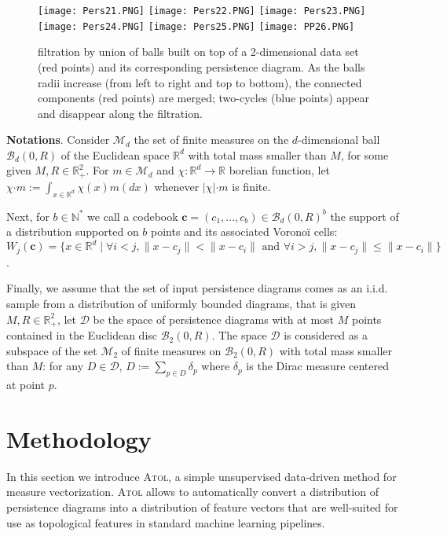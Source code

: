\documentclass[twoside]{article}
\newcommand{\cb}{\mathbf{c}}
\begin{document}
\begin{figure}
	\centering
	\texttt{[image: Pers21.PNG]}
	\texttt{[image: Pers22.PNG]}
	\texttt{[image: Pers23.PNG]}\\
	\texttt{[image: Pers24.PNG]}
	\texttt{[image: Pers25.PNG]}
	\texttt{[image: PP26.PNG]}
	\caption{filtration by union of balls built on top of a 2-dimensional data set (red points) and its corresponding persistence diagram. As the balls radii increase (from left to right and top to bottom), the connected components (red points) are merged; two-cycles (blue points) appear and disappear along the filtration.}
	\label{fig:persistence}
\end{figure}


\textbf{Notations}. Consider $\mathcal{M}_d$ the set of finite measures on the $d$-dimensional ball $\mathcal{B}_d(0,R)$ of the Euclidean space $\mathbb{R}^d$ with total mass smaller than $M$, for some given $M,R \in \mathbb{R}_+^2$. For $m \in \mathcal{M}_d$ and $\chi: \mathbb{R}^d \rightarrow \mathbb{R}$ borelian function, let $\chi \boldsymbol{\cdot} m := \int_{x \in \mathbb{R}^d} \chi(x) m(dx)$ whenever $|\chi| \boldsymbol{\cdot} m$ is finite.

Next, for $b \in \mathbb{N}^*$ we call a codebook $\cb = (c_1, \dots, c_b) \in \mathcal{B}_d(0, R)^b$ the support of a distribution supported on $b$ points and its associated Voronoï cells: $W_j(\cb) = \{ x \in \mathbb{R}^d \mid \forall i < j, \| x - c_j\| < \| x-c_i\| \text{ and } \forall{i >j}, \| x- c_j\| \leqslant \|x-c_i\| \}$.

Finally, we assume that the set of input persistence diagrams comes as an i.i.d. sample from a distribution of uniformly bounded diagrams, that is given $M,R \in \mathbb{R}_+^2$, let $\mathcal{D}$ be the space of persistence diagrams with at most $M$ points contained in the Euclidean disc $\mathcal{B}_2(0,R)$. The space $\mathcal{D}$ is considered as a subspace of the set $\mathcal{M}_2$ of finite measures on $\mathcal{B}_2(0,R)$  with total mass smaller than $M$: for any $D \in \mathcal{D}$, $D := \sum_{p \in D} \delta_p$ where $\delta_p$ is the Dirac measure centered at point $p$.


\section{Methodology}

In this section we introduce \textsc{Atol}, a simple unsupervised data-driven method for measure vectorization. \textsc{Atol} allows to automatically convert a distribution of persistence diagrams into a distribution of feature vectors that are well-suited for use as topological features in standard machine learning pipelines.
\end{document}
